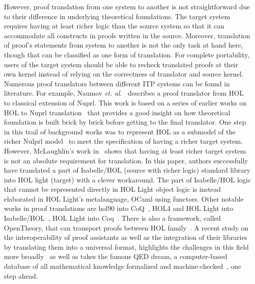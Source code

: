 However, proof translation from one system to another is not straightforward due to their difference in underlying theoretical foundations. The target system requires having at least richer logic than the source system so that it can accommodate all constructs in proofs written in the source. Moreover, translation of proof's statements from system to another is not the only task at hand here, though that can be classified as one form of translation. For complete portability, users of the target system should be able to recheck translated proofs at their own kernel instead of relying on the correctness of translator and source kernel. Numerous proof translators between different ITP systems can be found in literature. For example, Naumov \emph{et. al.}~\cite{Naumov_et_al_2001} describes a proof translator from HOL to classical extension of Nuprl. This work is based on a series of earlier works on HOL to Nuprl translation~\cite{Howe_1996_a, Howe_1996_b, Felty_1997} that provides a good insight on how theoretical foundation is built brick by brick before getting to the final translator. One step in this trail of background works was to represent HOL as a submodel of the richer Nulprl model~\cite{Howe_1996_a} to meet the specification of having a richer target system. However, McLaughlin's work in~\cite{McLaughlin_2006} shows that having at least richer target system is not an absolute requirement for translation. In this paper, authors successfully have translated a part of Isabelle/HOL (source with richer logic) standard library into HOL light (target) with a clever workaround. The part of Isabelle/HOL logic that cannot be represented directly in HOL Light object logic is instead elaborated in HOL Light's metalanguage, OCaml using functors. Other notable works in proof translations are hol90 into CoQ~\cite{Denney_2000}, HOL4 and HOL Light into Isabelle/HOL~\cite{Obua_2006, Kaliszyk_Krauss_2013}, HOL Light into Coq~\cite{Keller_Werner_2010}. There is also a framework, called OpenTheory, that can transport proofs between HOL family~\cite{Hurd_2011}. A recent study on the interoperability of proof assistants as well as the integration of their libraries by translating them into a universal format, highlights the challenges in this field more broadly~\cite{Kohlhase_Rabe_2016, Kohlhase_Rabe_2020} as well as takes the famous QED dream, a computer-based database of all mathematical knowledge formalized and machine-checked~\cite{QED_Manifesto_1994}, one step ahead. 


